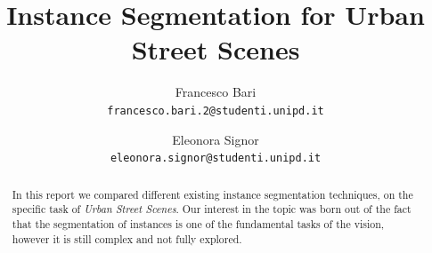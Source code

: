 \documentclass[10pt,twocolumn,letterpaper]{article}
\begin{document}
\title{Instance Segmentation for Urban Street Scenes}

\author{Francesco Bari\\
{\tt\small francesco.bari.2@studenti.unipd.it}
\and
Eleonora Signor\\
{\tt\small eleonora.signor@studenti.unipd.it}
}

\maketitle

\begin{abstract}
In this report we compared different existing instance segmentation techniques, on the specific task of \textit{Urban Street Scenes}. Our interest in the topic was born out of the fact that the segmentation of instances is one of the fundamental tasks of the vision, however it is still complex and not fully explored.
\end{abstract}

\end{document}
